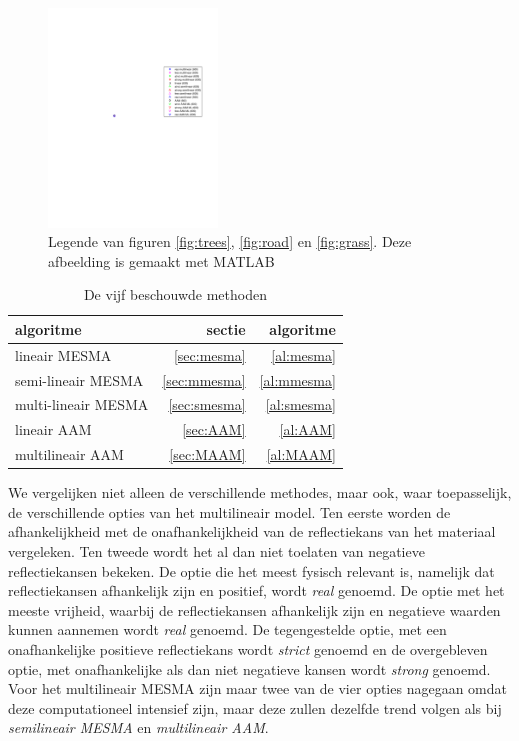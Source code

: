 \documentclass[12pt]{report}
\begin{document}
\begin{figure}
\includegraphics[width=0.4\textwidth, trim=400 450 0 175 cm,clip]{plot_legend.pdf}
\caption{Legende van figuren \ref{fig:trees}, \ref{fig:road} en \ref{fig:grass}. Deze afbeelding is gemaakt met MATLAB\cite{matlab} \label{fig:legend}}
\end{figure}
\begin{table}
\begin{tabular}{l r r}
algoritme & sectie & algoritme \\
\hline
lineair MESMA & \ref{sec:mesma} & \ref{al:mesma}\\
semi-lineair MESMA & \ref{sec:mmesma} &\ref{al:mmesma}\\
multi-lineair MESMA & \ref{sec:smesma} &\ref{al:smesma}\\
lineair AAM & \ref{sec:AAM}&\ref{al:AAM} \\
multilineair AAM & \ref{sec:MAAM} & \ref{al:MAAM} 
\end{tabular}
\caption{De vijf beschouwde methoden \label{tab:a}}
\end{table}


We vergelijken niet alleen de verschillende methodes, maar ook, waar toepasselijk, de verschillende opties van het multilineair model. Ten eerste worden de afhankelijkheid met de onafhankelijkheid van de reflectiekans van het materiaal vergeleken. Ten tweede wordt het al dan niet toelaten van negatieve reflectiekansen bekeken. De optie die het meest fysisch relevant is, namelijk dat reflectiekansen afhankelijk zijn en positief, wordt \textit{real} genoemd. De optie met het meeste vrijheid, waarbij de reflectiekansen afhankelijk zijn en negatieve waarden kunnen aannemen wordt \textit{real} genoemd. De tegengestelde optie, met een onafhankelijke positieve reflectiekans wordt \textit{strict} genoemd en de overgebleven optie, met onafhankelijke als dan niet negatieve kansen wordt \textit{strong} genoemd. Voor het multilineair MESMA zijn maar twee van de vier opties nagegaan omdat deze computationeel intensief zijn, maar deze zullen dezelfde trend volgen als bij \textit{semilineair MESMA} en \textit{multilineair AAM}.  
\end{document}
